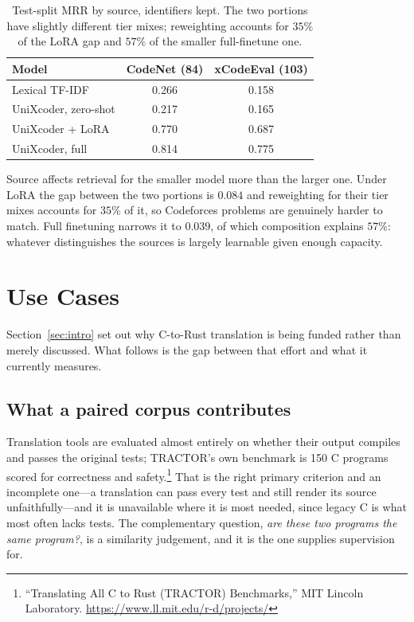 \begin{table}[tbp]
\caption{Test-split MRR by source, identifiers kept. The two portions have
slightly different tier mixes; reweighting accounts for $35\%$ of the LoRA gap
and $57\%$ of the smaller full-finetune one.}
\label{tab:byorigin}
\centering
\begin{tabular}{lcc}
\toprule
Model & CodeNet (84) & xCodeEval (103) \\
\midrule
Lexical TF-IDF       & 0.266 & 0.158 \\
UniXcoder, zero-shot & 0.217 & 0.165 \\
UniXcoder + LoRA     & 0.770 & 0.687 \\
UniXcoder, full      & 0.814 & 0.775 \\
\bottomrule
\end{tabular}
\end{table}

Source affects retrieval for the smaller model more than the larger one. Under
LoRA the gap between the two portions is $0.084$ and reweighting for their tier
mixes accounts for $35\%$ of it, so Codeforces problems are genuinely
harder to match. Full finetuning narrows it to $0.039$, of which composition
explains $57\%$: whatever distinguishes the sources is largely learnable given
enough capacity.
\fi

\section{Use Cases}
\label{sec:usecases}

Section~\ref{sec:intro} set out why C-to-Rust translation is being
funded rather than merely discussed. What follows is the gap between that
effort and what it currently measures.

\subsection{What a paired corpus contributes}

Translation tools are evaluated almost entirely on whether their output
compiles and passes the original tests; TRACTOR's own benchmark is 150 C
programs scored for correctness and
safety.\footnote{``Translating All C to Rust (TRACTOR) Benchmarks,'' MIT
Lincoln Laboratory. \url{https://www.ll.mit.edu/r-d/projects/}} That
is the right primary criterion and an incomplete one---a translation can pass
every test and still render its source unfaithfully---and it is unavailable
where it is most needed, since legacy C is what most often lacks tests. The
complementary question, \emph{are these two programs the same program?}, is a
similarity judgement, and it is the one \dsname{} supplies supervision for.


